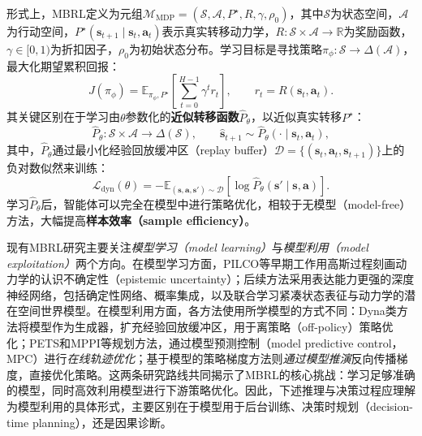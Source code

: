 形式上，MBRL定义为元组$\mathcal{M}_{\mathrm{MDP}} = (\mathcal{S}, \mathcal{A}, P^\star, R, \gamma, \rho_0)$，其中$\mathcal{S}$为状态空间，$\mathcal{A}$为行动空间，$P^\star(\mathbf{s}_{t+1} \mid \mathbf{s}_t, \mathbf{a}_t)$表示真实转移动力学，$R: \mathcal{S} \times \mathcal{A} \to \mathbb{R}$为奖励函数，$\gamma \in [0,1)$为折扣因子，$\rho_0$为初始状态分布。学习目标是寻找策略$\pi_\phi: \mathcal{S} \to \Delta(\mathcal{A})$，最大化期望累积回报：
\begin{equation}
    J(\pi_\phi)
    =
    \mathbb{E}_{\pi_\phi,P^\star}
    \left[
    \sum_{t=0}^{H-1}\gamma^t r_t
    \right],
    \qquad
    r_t = R(\mathbf{s}_t,\mathbf{a}_t).
\end{equation}
其关键区别在于学习由$\theta$参数化的\textbf{近似转移函数}$\widehat P_\theta$，以近似真实转移$P^\star$：
\begin{equation}
    \widehat P_\theta:
    \mathcal{S}\times\mathcal{A}\to\Delta(\mathcal{S}),
    \qquad
    \widehat{\mathbf{s}}_{t+1}
    \sim
    \widehat P_\theta(\cdot\mid\mathbf{s}_t,\mathbf{a}_t),
\end{equation}
其中，$\widehat P_\theta$通过最小化经验回放缓冲区（replay buffer）$\mathcal{D} = \{(\mathbf{s}_t, \mathbf{a}_t, \mathbf{s}_{t+1})\}$上的负对数似然来训练：
\begin{equation}
\label{eq:learn_dynamic_mbrl}
    \mathcal{L}_{\mathrm{dyn}}(\theta)
    =
    -\mathbb{E}_{(\mathbf{s},\mathbf{a},\mathbf{s}')\sim\mathcal{D}}
    \left[
    \log \widehat P_\theta(\mathbf{s}'\mid\mathbf{s},\mathbf{a})
    \right].
\end{equation}
学习$\widehat P_\theta$后，智能体可以完全在模型中进行策略优化，相较于无模型（model-free）方法，大幅提高\textbf{样本效率（sample efficiency）}。

现有MBRL研究主要关注\textit{模型学习（model learning）}与\textit{模型利用（model exploitation）}两个方向。在模型学习方面，PILCO等早期工作\citep{deisenroth2011pilco}用高斯过程刻画动力学的认识不确定性（epistemic uncertainty）；后续方法采用表达能力更强的深度神经网络，包括确定性网络\citep{nagabandi2018mbmf}、概率集成\citep{chua2018pets,janner2019mbpo}，以及联合学习紧凑状态表征与动力学的潜在空间世界模型\citep{hafner2019dreamer,hafner2020dreamerv2,hafner2023dreamerv3}。在模型利用方面，各方法使用所学模型的方式不同：Dyna类方法\citep{sutton1990dyna,janner2019mbpo}将模型作为生成器，扩充经验回放缓冲区，用于离策略（off-policy）策略优化；PETS\citep{chua2018pets}和MPPI\citep{williams2017mppi}等规划方法，通过模型预测控制（model predictive control，MPC）进行\textit{在线轨迹优化}；基于模型的策略梯度方法\citep{heess2015svg,clavera2020mbmpo}则\textit{通过模型推演}反向传播梯度，直接优化策略。这两条研究路线共同揭示了MBRL的核心挑战：学习足够准确的模型，同时高效利用模型进行下游策略优化。因此，下述推理与决策过程应理解为模型利用的具体形式，主要区别在于模型用于后台训练、决策时规划（decision-time planning），还是因果诊断。

